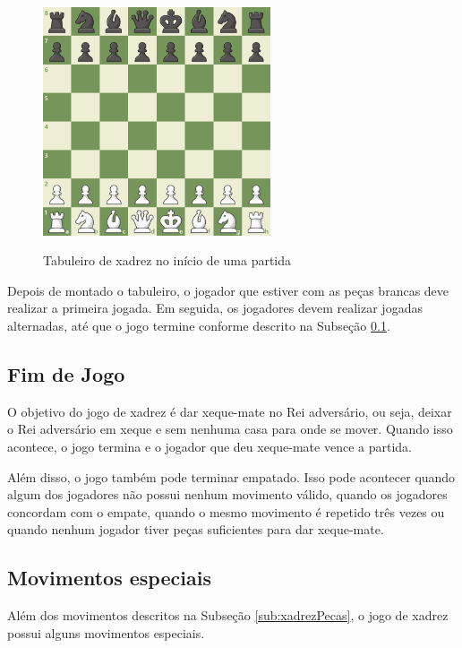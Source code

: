 \begin{figure}[H]
    \centering
    \caption{Tabuleiro de xadrez no início de uma partida}
    \includegraphics[keepaspectratio=true, width=0.6\textwidth]
    	{img/xadrez-tabuleiro-montado.png}
    \label{fig:xadrezTabuleiroMontado}
\end{figure}

Depois de montado o tabuleiro, o jogador que estiver com as peças brancas deve realizar a primeira jogada.
Em seguida, os jogadores devem realizar jogadas alternadas, até que o jogo termine conforme descrito na Subseção \ref{sub:xadrezFimJogo}.

\subsection[Fim de Jogo]{Fim de Jogo}
\label{sub:xadrezFimJogo}

O objetivo do jogo de xadrez é dar xeque-mate no Rei adversário, ou seja, deixar o Rei adversário em xeque e sem nenhuma casa para onde se mover.
Quando isso acontece, o jogo termina e o jogador que deu xeque-mate vence a partida.

Além disso, o jogo também pode terminar empatado.
Isso pode acontecer quando algum dos jogadores não possui nenhum movimento válido,
quando os jogadores concordam com o empate, quando o mesmo movimento é repetido três vezes
ou quando nenhum jogador tiver peças suficientes para dar xeque-mate.

\subsection[Movimentos especiais]{Movimentos especiais}

Além dos movimentos descritos na Subseção \ref{sub:xadrezPecas}, o jogo de xadrez possui alguns movimentos especiais.

